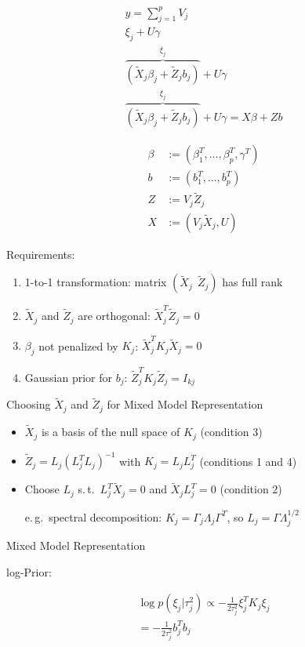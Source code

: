 \documentclass[12pt]{article}
\begin{document}
\begin{align*}
y = \sum_{j=1}^p V_j\\
 \xi_j + U\gamma \\
\overbrace{(\tilde{X}_j \beta_j + \tilde{Z}_j b_j)}^{\xi_j} + U\gamma \\
\overbrace{(\tilde{X}_j \beta_j + \tilde{Z}_j b_j)}^{\xi_j} + U\gamma =   X\beta + Zb 
\end{align*}





\begin{align*}
\beta &:= (\beta_1^T,..., \beta_p^T, \gamma^T) \\
b &:= (b_1^T,...,b_p^T) \\
Z &:= V_j \tilde{Z}_j \\
X &:= (V_j \tilde{X}_j, U)
\end{align*}


Requirements:

\begin{enumerate}
\item 1-to-1 transformation: matrix $(\tilde{X}_j \:\:  \tilde{Z}_j)$ has full rank 
\item $\tilde{X}_j$ and $\tilde{Z}_j$ are orthogonal: $\tilde{X}_j^T \tilde{Z}_j = 0$
\item $\beta_j$ not penalized by $K_j$: $\tilde{X}_j^T K_j \tilde{X}_j = 0$
\item Gaussian prior for $b_j$: $\tilde{Z}_j^T K_j \tilde{Z}_j = I_{kj}$
\end{enumerate}



Choosing $\tilde{X}_j$ and $\tilde{Z}_j$ for Mixed Model Representation


\begin{itemize}
\item $\tilde{X}_j$ is a basis of the null space of $K_j$ (condition 3)
\item $\tilde{Z}_j =L_j (L_j^T L_j)^{-1}$ with $K_j =L_j L_j^T$ (conditions 1 and 4)
\item Choose $L_j$ s.\,t.\ $L_j^T\tilde{X}_j = 0$ and $\tilde{X}_jL_j^T = 0$ (condition 2)

e.\,g.\ spectral decomposition: 
$K_j = \Gamma_j \Lambda_j \Gamma^T$, so $L_j = \Gamma \Lambda_j^{1/2}$
\end{itemize}


Mixed Model Representation

log-Prior:

\begin{align*}
\log p(\xi_j|\tau_j^2)  \propto -\frac{1}{2\tau^2_j} \xi_j^TK_j \xi_j \\
= -\frac{1}{2\tau_j^2} b_j^T b_j
\end{align*}
\end{document}
